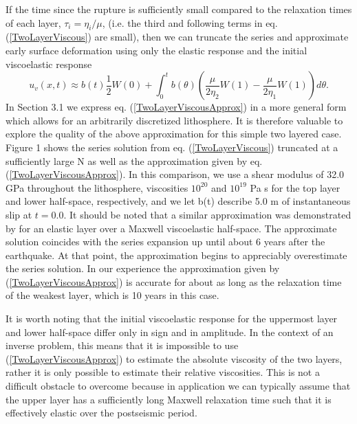 \documentclass[extra]{gji}
\begin{document}
If the time since the rupture is sufficiently small compared to the
relaxation times of each layer, $\tau_i=\eta_i/\mu$, (i.e. the third
and following terms in eq. (\ref{TwoLayerViscous}) are small), then we
can truncate the series and approximate early surface deformation
using only the elastic response and the initial viscoelastic response
\begin{equation}\label{TwoLayerViscousApprox}
 u_v(x,t) \approx b(t)\frac{1}{2}W(0) + 
          \int_0^t b(\theta)\left(\frac{\mu}{2\eta_2}W(1) - 
                  \frac{\mu}{2\eta_1}W(1)\right)d\theta.
\end{equation} 
In Section 3.1 we express eq. (\ref{TwoLayerViscousApprox}) in a more
general form which allows for an arbitrarily discretized lithosphere.
It is therefore valuable to explore the quality of the above
approximation for this simple two layered case. Figure 1 shows the
series solution from eq. (\ref{TwoLayerViscous}) truncated at a
sufficiently large N as well as the approximation given by
eq. (\ref{TwoLayerViscousApprox}). In this comparison, we use a shear
modulus of 32.0 GPa throughout the lithosphere, viscosities $10^{20}$
and $10^{19}$ Pa s for the top layer and lower half-space,
respectively, and we let b(t) describe 5.0 m of instantaneous slip
at $t=0.0$.  It should be noted that a similar approximation was
demonstrated by \citet{S2010} for an elastic layer over a Maxwell
viscoelastic half-space.  The approximate solution coincides with the
series expansion up until about 6 years after the earthquake.  At that
point, the approximation begins to appreciably overestimate the series
solution.  In our experience the approximation given by
(\ref{TwoLayerViscousApprox}) is accurate for about as long as the
relaxation time of the weakest layer, which is 10 years in this case.

It is worth noting that the initial viscoelastic response for the
uppermost layer and lower half-space differ only in sign and in
amplitude.  In the context of an inverse problem, this means that it
is impossible to use (\ref{TwoLayerViscousApprox}) to estimate the
absolute viscosity of the two layers, rather it is only possible to
estimate their relative viscosities.  This is not a difficult obstacle
to overcome because in application we can typically assume that the
upper layer has a sufficiently long Maxwell relaxation time such that
it is effectively elastic over the postseismic period.
\end{document}
